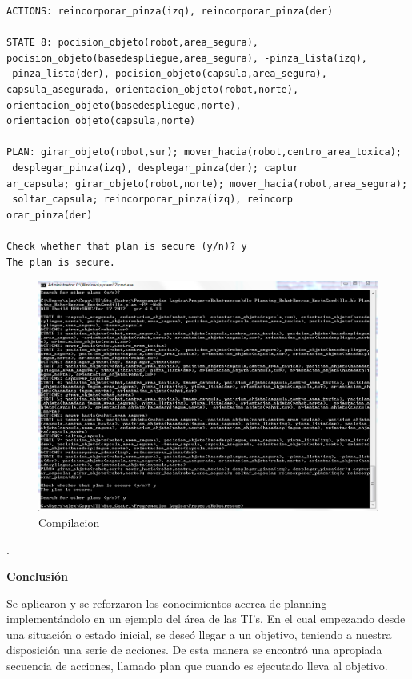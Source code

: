 \documentclass[letterpaper ,10pt]{article}
\begin{document}
{{{{{{\begin{lstlisting}
ACTIONS: reincorporar_pinza(izq), reincorporar_pinza(der)

STATE 8: pocision_objeto(robot,area_segura),
pocision_objeto(basedespliegue,area_segura), -pinza_lista(izq),
-pinza_lista(der), pocision_objeto(capsula,area_segura), 
capsula_asegurada, orientacion_objeto(robot,norte), 
orientacion_objeto(basedespliegue,norte), orientacion_objeto(capsula,norte)

PLAN: girar_objeto(robot,sur); mover_hacia(robot,centro_area_toxica);
 desplegar_pinza(izq), desplegar_pinza(der); captur
ar_capsula; girar_objeto(robot,norte); mover_hacia(robot,area_segura);
 soltar_capsula; reincorporar_pinza(izq), reincorp
orar_pinza(der)

Check whether that plan is secure (y/n)? y
The plan is secure.
\end{lstlisting}

}
\begin{figure}[htb]
\hspace*{-3cm} \includegraphics[width=1.5\textwidth]{compile}
\caption{Compilacion}
\end{figure}

\newpage
.
\\
\newpage

\centerline {\Huge\sffamily\textbf{Conclusión  }}
\vspace{0.5cm}
\noindent Se aplicaron y se reforzaron los conocimientos acerca de planning implementándolo en un ejemplo del área de las TI’s. En el cual empezando desde una situación o estado inicial, se deseó llegar a un objetivo, teniendo a nuestra disposición una serie de acciones. De esta manera se encontró una apropiada secuencia de acciones, llamado plan que cuando es ejecutado lleva al objetivo.

}}}}}
\end{document}
